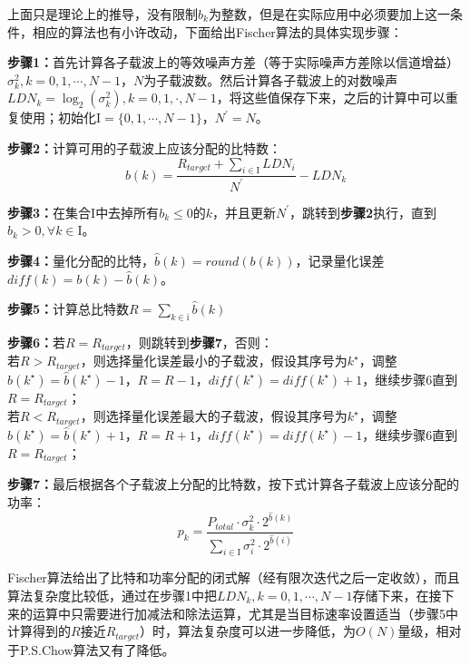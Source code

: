 上面只是理论上的推导，没有限制$b_k$为整数，但是在实际应用中必须要加上这一条件，相应的算法也有小许改动，下面给出Fischer算法的具体实现步骤：
\begin{description}
\item{\bf{步骤1：}}首先计算各子载波上的等效噪声方差（等于实际噪声方差除以信道增益）$\sigma_k^2,k=0,1,\cdots,N-1$，$N$为子载波数。然后计算各子载波上的对数噪声$LDN_k=\log_2(\sigma_k^2),k=0,1,\cdot,N-1$，将这些值保存下来，之后的计算中可以重复使用；初始化$\mathrm{I}=\{0,1,\cdots,N-1\}$，$N^\prime=N$。
\item{\bf{步骤2：}}计算可用的子载波上应该分配的比特数：
\begin{equation}
b(k) = \frac{R_{target}+\sum_{i\in \mathrm{I}}LDN_i}{N^\prime}-LDN_k
\end{equation}
\item{\bf{步骤3：}}在集合$\mathrm{I}$中去掉所有$b_k\leq 0$的$k$，并且更新$N^\prime$，跳转到\textbf{步骤2}执行，直到$b_k>0, \forall k\in \mathrm{I}$。
\item{\bf{步骤4：}}量化分配的比特，$\hat{b}(k)=round(b(k))$，记录量化误差$diff(k)=b(k)-\hat{b}(k)$。
\item{\bf{步骤5：}}计算总比特数$R=\sum_{k\in \mathrm{i}}\hat{b}(k)$
\item{\bf{步骤6：}}若$R=R_{target}$，则跳转到\textbf{步骤7}，否则：\\
若$R>R_{target}$，则选择量化误差最小的子载波，假设其序号为$k^\star$，调整$\hat{b}(k^\star)=\hat{b}(k^\star)-1$，$R=R-1$，$diff(k^\star)=diff(k^\star)+1$，继续步骤6直到$R=R_{target}$；\\
若$R<R_{target}$，则选择量化误差最大的子载波，假设其序号为$k^\star$，调整$\hat{b}(k^\star)=\hat{b}(k^\star)+1$，$R=R+1$，$diff(k^\star)=diff(k^\star)-1$，继续步骤6直到$R=R_{target}$；
\item{\bf{步骤7：}}最后根据各个子载波上分配的比特数，按下式计算各子载波上应该分配的功率：
\begin{equation}
p_k = \frac{P_{total}\cdot \sigma_k^2\cdot 2^{\hat{b}(k)}}{\sum_{i\in \mathrm{I}}\sigma_i^2\cdot 2^{\hat{b}(i)}}
\end{equation}
\end{description}

Fischer算法给出了比特和功率分配的闭式解（经有限次迭代之后一定收敛），而且算法复杂度比较低，通过在步骤1中把$LDN_k, k=0,1,\cdots,N-1$存储下来，在接下来的运算中只需要进行加减法和除法运算，尤其是当目标速率设置适当（步骤5中计算得到的$R$接近$R_{target}$）时，算法复杂度可以进一步降低，为$O(N)$量级，相对于P.S.Chow算法又有了降低。

